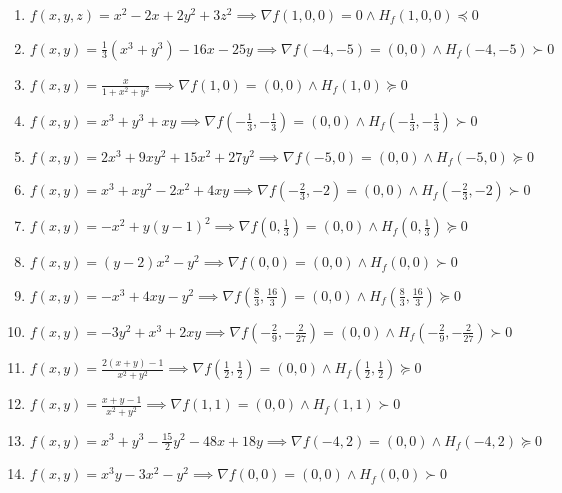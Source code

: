 \documentclass[11pt,a4paper]{article}
\begin{document}
\begin{enumerate}
\item $\displaystyle f(x, y, z) = x^{2} - 2x + 2y^{2} + 3z^{2} \implies \nabla f(1, 0, 0) = 0 \land H_{f}(1, 0, 0) \preceq 0$
\item $\displaystyle f(x, y) = \frac{1}{3}(x^{3} + y^{3}) - 16x - 25y \implies \nabla f(-4, -5) = (0, 0) \land H_{f}(-4, -5) \succ 0$
\item $\displaystyle f(x, y) = \frac{x}{1 + x^{2} + y^{2}} \implies \nabla f(1, 0) = (0, 0) \land H_{f}(1, 0) \succeq 0$
\item $\displaystyle f(x, y) = x^{3} + y^{3} + xy \implies \nabla f\left( -\frac{1}{3}, -\frac{1}{3} \right) = (0, 0) \land H_{f}\left( -\frac{1}{3}, -\frac{1}{3} \right) \succ 0$
\item $\displaystyle f(x, y) = 2x^{3} + 9x y^{2} + 15x^{2} + 27y^{2} \implies \nabla f(-5, 0) = (0, 0) \land H_{f}(-5, 0) \succeq 0$
\item $\displaystyle f(x, y) = x^{3} + x y^{2} - 2x^{2} + 4xy \implies \nabla f\left( -\frac{2}{3}, -2 \right) = (0, 0) \land H_{f}\left( -\frac{2}{3}, -2 \right) \succ 0$
\item $\displaystyle f(x, y) = -x^{2} + y(y - 1)^{2} \implies \nabla f\left( 0, \frac{1}{3} \right) = (0, 0) \land H_{f}\left( 0, \frac{1}{3} \right) \succeq 0$
\item $\displaystyle f(x, y) = (y - 2) x^{2} - y^{2} \implies \nabla f(0, 0) = (0, 0) \land H_{f}(0, 0) \succ 0$
\item $\displaystyle f(x, y) = -x^{3} + 4xy - y^{2} \implies \nabla f\left( \frac{8}{3}, \frac{16}{3} \right) = (0, 0) \land H_{f}\left( \frac{8}{3}, \frac{16}{3} \right) \succeq 0$
\item $\displaystyle f(x, y) = -3y^{2} + x^{3} + 2xy \implies \nabla f\left( -\frac{2}{9}, -\frac{2}{27} \right) = (0, 0) \land H_{f}\left( -\frac{2}{9}, -\frac{2}{27} \right) \succ 0$
\item $\displaystyle f(x, y) = \frac{2(x + y) - 1}{x^{2} + y^{2}} \implies \nabla f\left( \frac{1}{2}, \frac{1}{2} \right) = (0, 0) \land H_{f}\left( \frac{1}{2}, \frac{1}{2} \right) \succeq 0$
\item $\displaystyle f(x, y) = \frac{x + y - 1}{x^{2} + y^{2}} \implies \nabla f(1, 1) = (0, 0) \land H_{f}(1, 1) \succ 0$
\item $\displaystyle f(x, y) = x^{3} + y^{3} - \frac{15}{2} y^{2} - 48x + 18y \implies \nabla f(-4, 2) = (0, 0) \land H_{f}(-4, 2) \succeq 0$
\item $\displaystyle f(x, y) = x^{3} y - 3x^{2} - y^{2} \implies \nabla f(0, 0) = (0, 0) \land H_{f}(0, 0) \succ 0$

\end{enumerate}
\end{document}

